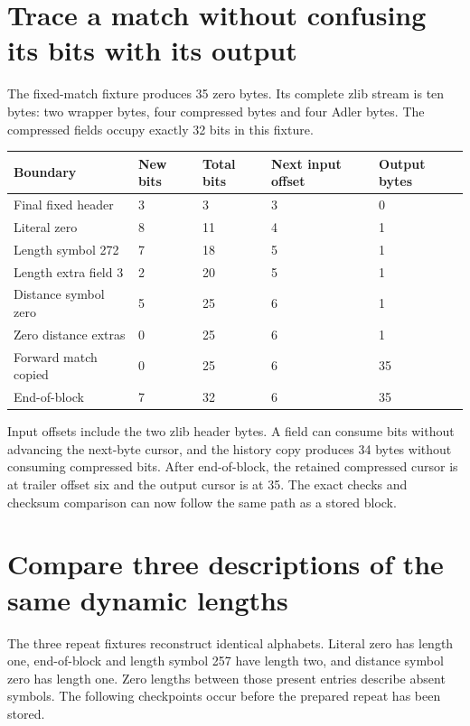 \section{Trace a match without confusing its bits with its output}
The fixed-match fixture produces 35 zero bytes. Its complete zlib stream is ten bytes:
two wrapper bytes, four compressed bytes and four Adler bytes. The compressed fields
occupy exactly 32 bits in this fixture.

\begin{longtable}{p{40mm}p{22mm}p{26mm}p{29mm}p{27mm}}
  \toprule Boundary    & New bits & Total bits & Next input offset & Output bytes \\\midrule
  Final fixed header   & 3        & 3          & 3                 & 0            \\
  Literal zero         & 8        & 11         & 4                 & 1            \\
  Length symbol 272    & 7        & 18         & 5                 & 1            \\
  Length extra field 3 & 2        & 20         & 5                 & 1            \\
  Distance symbol zero & 5        & 25         & 6                 & 1            \\
  Zero distance extras & 0        & 25         & 6                 & 1            \\
  Forward match copied & 0        & 25         & 6                 & 35           \\
  End-of-block         & 7        & 32         & 6                 & 35           \\\bottomrule
\end{longtable}
Input offsets include the two zlib header bytes. A field can consume bits without
advancing the next-byte cursor, and the history copy produces 34 bytes without consuming
compressed bits. After end-of-block, the retained compressed cursor is at trailer
offset six and the output cursor is at 35. The exact checks and checksum comparison
can now follow the same path as a stored block.

\section{Compare three descriptions of the same dynamic lengths}
The three repeat fixtures reconstruct identical alphabets. Literal zero has length
one, end-of-block and length symbol 257 have length two, and distance symbol zero has
length one. Zero lengths between those present entries describe absent symbols.
The following checkpoints occur before the prepared repeat has been stored.

